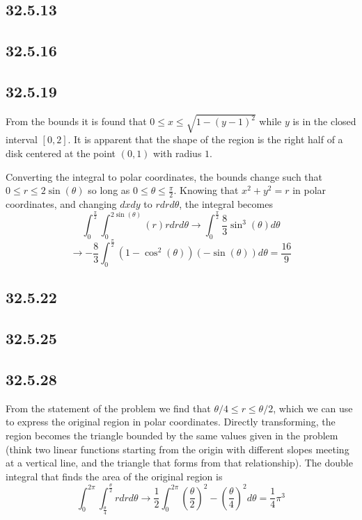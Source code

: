 \documentclass{article}
\begin{document}
\subsection{32.5.13}

\subsection{32.5.16}

\subsection{32.5.19}

From the bounds it is found that $ 0 \leq x \leq \sqrt{1-(y-1)^2}$ while $y$ is in the closed interval $[0,2]$. It is apparent that the shape of the region is the right half of a disk centered at the point $(0,1)$ with radius $1$.

Converting the integral to polar coordinates, the bounds change such that $0 \leq r \leq 2\sin(\theta)$ so long as $0 \leq \theta \leq \frac{\pi}{2}$. Knowing that $x^2+y^2 = r$ in polar coordinates, and changing $dxdy$ to $rdrd\theta$, the integral becomes $$\int_{0}^{\frac{\pi}{2}}\int_{0}^{2\sin(\theta)} \left(r\right)rdrd\theta \to \int_{0}^{\frac{\pi}{2}}\frac{8}{3}\sin^3(\theta) d\theta$$
$$\to -
\frac{8}{3}\int_{0}^{\frac{\pi}{2}}(1-\cos^2(\theta))(-\sin(\theta))d\theta = \frac{16}{9}$$

\subsection{32.5.22}

\subsection{32.5.25}

\subsection{32.5.28}

From the statement of the problem we find that $\theta/4 \leq r \leq \theta/2$, which we can use to express the original region in polar coordinates. Directly transforming, the region becomes the triangle bounded by the same values given in the problem (think two linear functions starting from the origin with different slopes meeting at a vertical line, and the triangle that forms from that relationship). The double integral that finds the area of the original region is $$\int_{0}^{2\pi}\int_{\frac{\theta}{4}}^{\frac{\theta}{2}} rdrd\theta \to \frac{1}{2}\int_{0}^{2\pi}\left(\frac{\theta}{2}\right)^2-\left(\frac{\theta}{4}\right)^2 d\theta = \frac{1}{4}\pi^3$$
\end{document}
